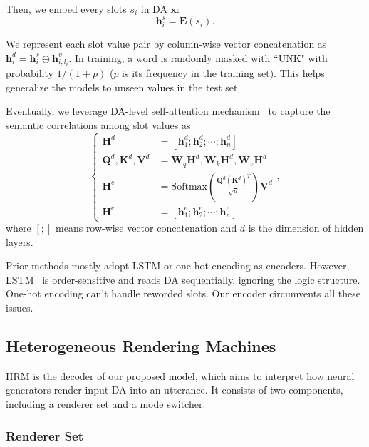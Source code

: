 \documentclass[letterpaper]{article} %
\begin{document}
Then, we embed every slots $s_i$ in DA $\mathbf{x}$:
\begin{equation}
\mathbf{h}^s_i = \mathbf{E}(s_i).
\end{equation}

We represent each slot value pair by column-wise vector concatenation as $\mathbf{h}^d_i = \mathbf{h}^s_i \oplus \mathbf{h}_{i,l_i}^v$.  In training, a word is randomly masked with ``UNK" with probability $1 / (1 + p)$ ($p$ is its frequency in the training set). This helps generalize the models to unseen values in the test set.

Eventually, we leverage DA-level self-attention mechanism~\citep{vaswani2017attention} to capture the semantic correlations among slot values as
\begin{equation}
\left\{\begin{aligned}
\mathbf{H}^d & = [\mathbf{h}_1^d; \mathbf{h}_2^d; \cdots; \mathbf{h}_n^d] \\
\mathbf{Q}^d, \mathbf{K}^d, \mathbf{V}^d & = \mathbf{W}_q\mathbf{H}^d, \mathbf{W}_k\mathbf{H}^d, \mathbf{W}_v\mathbf{H}^d \\
\mathbf{H}^e & = \mathrm{Softmax}(\frac{\mathbf{Q}^d(\mathbf{K}^d)^T}{\sqrt{d}})\mathbf{V}^d \\
\mathbf{H}^e & = [\mathbf{h}_1^e; \mathbf{h}_2^e; \cdots; \mathbf{h}_n^e]
\end{aligned}\right.,
\end{equation}
where $[;]$ means row-wise vector concatenation and $d$ is the dimension of hidden layers.

Prior methods mostly adopt LSTM or one-hot encoding as encoders. However, LSTM~\citep{hochreiter1997long} is order-sensitive and reads DA sequentially, ignoring the logic structure. One-hot encoding can't handle reworded slots. Our encoder circumvents all these issues.

\subsection{Heterogeneous Rendering Machines}
\label{sec:Heterogeneous Rendering Machines}

HRM is the decoder of our proposed model, which aims to interpret how neural generators render input DA into an utterance. It consists of two components, including a renderer set and a mode switcher.

\subsubsection{Renderer Set}
\end{document}
